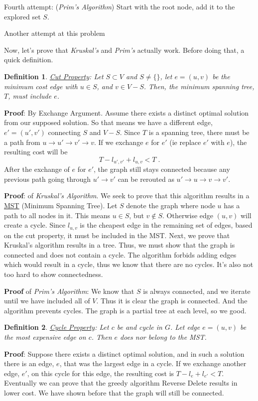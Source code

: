 \documentclass[11pt,letterpaper]{article}
\newtheorem{defn}{Definition}
\begin{document}
Fourth attempt: (\textit{Prim's Algorithm}) Start with the root node, add it to the explored set $S$. 
\begin{algorithm}
	\caption{Another attempt at this problem}
\end{algorithm}

Now, let's prove that \textit{Kruskal's} and \textit{Prim's} actually work. Before doing that, a quick definition.
\begin{defn}
	\underline{Cut Property}: Let $S \subset V$ and $S \neq \{\}$, let $e = (u,v)$ be the minimum cost edge with $u \in S$, and $v \in V-S$. Then, the minimum spanning tree, $T$, must include $e$.
\end{defn}
\textbf{Proof}: By Exchange Argument. Assume there exists a distinct optimal solution from our supposed solution. So that means we have a different edge, $e' = (u', v')$ connecting $S$ and $V-S$. Since $T$ is a spanning tree, there must be a path from $u\to u' \to v' \to v$. If we exchange $e$ for $e'$ (ie replace $e'$ with $e$), the resulting cost will be $$T-l_{u', v'} + l_{u,v} < T\; .$$ After the exchange of $e$ for $e'$, the graph still stays connected because any previous path going through $u' \to v'$ can be rerouted as $u'\to u\to v\to v'$. 

\textbf{Proof}: of \textit{Kruskal's Algorithm}. We seek to prove that this algorithm results in a \underline{MST} (Minimum Spanning Tree). Let $S$ denote the graph where node $u$ has a path to all nodes in it. This means $u \in S$, but $v \notin S$. Otherwise edge $(u,v)$ will create a cycle. Since $l_{u,v}$ is the cheapest edge in the remaining set of edges, based on the cut property, it must be included in the MST. Next, we prove that Kruskal's algorithm results in a tree. Thus, we must show that the graph is connected and does not contain a cycle. The algorithm forbids adding edges which would result in a cycle, thus we know that there are no cycles. It's also not too hard to show connectedness. 

\textbf{Proof} of \textit{Prim's Algorithm}: We know that $S$ is always connected, and we iterate until we have included all of $V$. Thus it is clear the graph is connected. And the algorithm prevents cycles. The graph is a partial tree at each level, so we good. 

\begin{defn}
	\underline{Cycle Property}: Let $c$ be and cycle in $G$. Let edge $e = (u, v)$ be the most expensive edge on $c$. Then $e$ does nor belong to the MST.
\end{defn}
\textbf{Proof}: Suppose there exists a distinct optimal solution, and in such a solution there is an edge, $e$, that was the largest edge in a cycle. If we exchange another edge, $e'$, on this cycle for this edge, the resulting cost is $T - l_{e} + l_{e'} < T$. Eventually we can prove that the greedy algorithm Reverse Delete results in lower cost. We have shown before that the graph will still be connected. 
\end{document}
